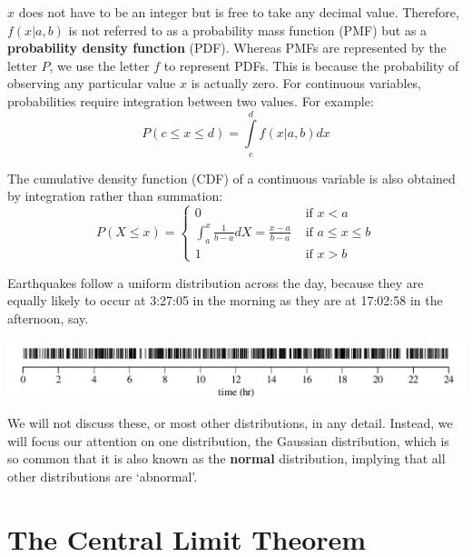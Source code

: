 \begin{itemize}
  $x$ does not have to be an integer but is free to take any decimal
  value. Therefore, $f(x|a,b)$ is not referred to as a probability
  mass function (PMF) but as a \textbf{probability density function}
  (PDF). Whereas PMFs are represented by the letter $P$, we use the
  letter $f$ to represent PDFs.  This is because the probability of
  observing any particular value $x$ is actually zero. For continuous
  variables, probabilities require integration between two values. For
  example:
  \begin{equation}
    P({c}\leq{x}\leq{d}) = \int\limits_{c}^{d} f(x|a,b) dx
  \end{equation}

  The cumulative density function (CDF) of a continuous variable is
  also obtained by integration rather than summation:
  \begin{equation}
    P(X\leq{x}) =
    \begin{cases}
      0 & \mbox{~if~} x < a\\
      \int_{a}^{x} \frac{1}{b-a} dX = \frac{x-a}{b-a} & \mbox{~if~} a \leq x \leq b\\
      1 & \mbox{~if~} x > b
    \end{cases}
  \end{equation}

  Earthquakes follow a uniform distribution across the day, because
  they are equally likely to occur at 3:27:05 in the morning as they
  are at 17:02:58 in the afternoon, say.

\noindent\includegraphics[width=\linewidth]{../figures/quakerug.pdf}
\begingroup {}
\endgroup
  
\end{itemize}

We will not discuss these, or most other distributions, in any detail.
Instead, we will focus our attention on one distribution, the Gaussian
distribution, which is so common that it is also known as the
\textbf{normal} distribution, implying that all other distributions
are `abnormal'.

\section{The Central Limit Theorem}
\label{sec:CLT}

